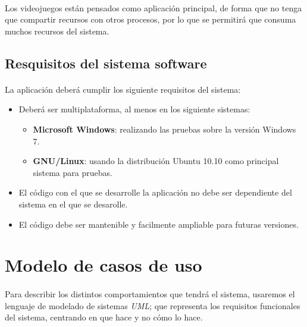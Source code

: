 \paragraph{}
Los videojuegos están pensados como aplicación principal, de forma que no tenga que compartir recursos con otros procesos,
por lo que se permitirá que consuma muchos recursos del sistema.

\subsection{Resquisitos del sistema software}

\paragraph{}
La aplicación deberá cumplir los siguiente requisitos del sistema:

\begin{itemize}
    \item Deberá ser multiplataforma, al menos en los siguiente sistemas:
    \begin{itemize}
        \item \textbf{Microsoft Windows}: realizando las pruebas sobre la versión Windows 7.
        \item \textbf{GNU/Linux}: usando la distribución Ubuntu 10.10 como principal sistema para pruebas.
    \end{itemize}
    
    \item El código con el que se desarrolle la aplicación no debe ser dependiente del sistema en el que se desarolle.
    
    \item El código debe ser mantenible y facilmente ampliable para futuras versiones.
\end{itemize}

\section{Modelo de casos de uso}

\paragraph{}
Para describir los distintos comportamientos que tendrá el sistema, usaremos el lenguaje de modelado de sistemas \emph{UML}; que
representa los requisitos funcionales del sistema, centrando en que hace y no cómo lo hace.

